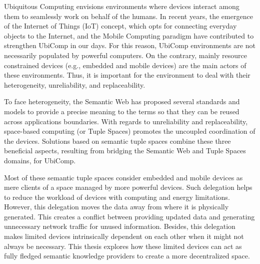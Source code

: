 




\begin{abstracts}        %
Ubiquitous Computing envisions environments where devices interact among them to seamlessly work on behalf of the humans.
In recent years, the emergence of the Internet of Things (IoT) concept, which opts for connecting everyday objects to the Internet, and the Mobile Computing paradigm have contributed to strengthen UbiComp in our days.
For this reason, UbiComp environments are not necessarily populated by powerful computers.
On the contrary, mainly resource constrained devices (e.g., embedded and mobile devices) are the main actors of these environments.
Thus, it is important for the environment to deal with their heterogeneity, unreliability, and replaceability.


To face heterogeneity, the Semantic Web has proposed several standards and models to provide a precise meaning to the terms so that they can be reused across applications boundaries.
With regards to unreliability and replaceability, space-based computing (or Tuple Spaces) promotes the uncoupled coordination of the devices.
Solutions based on semantic tuple spaces combine these three beneficial aspects, resulting from bridging the Semantic Web and Tuple Spaces domains, for UbiComp.

Most of these semantic tuple spaces consider embedded and mobile devices as mere clients of a space managed by more powerful devices.
Such delegation helps to reduce the workload of devices with computing and energy limitations.
However,  this delegation moves the data away from where it is physically generated.
This creates a conflict between providing updated data and generating unnecessary network traffic for unused information.
Besides, this delegation makes limited devices intrinsically dependent on each other when it might not always be necessary.
This thesis explores how these limited devices can act as fully fledged semantic knowledge providers to create a more decentralized space.


\end{abstracts}
